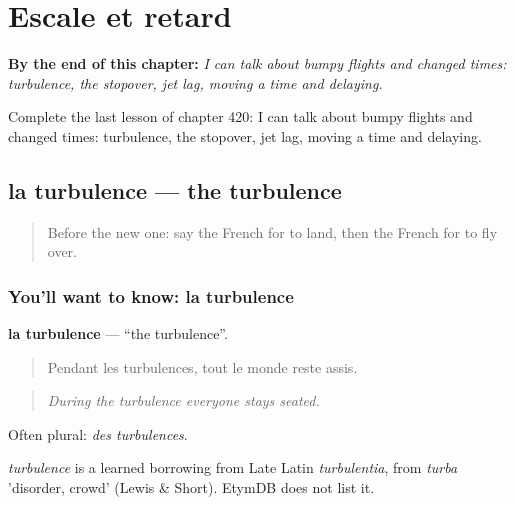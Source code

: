
\chapter{Escale et retard}
\label{ch:fr-escale-et-retard}

\begin{chapteropening}
\textbf{By the end of this chapter:} \emph{I can talk about bumpy flights and changed times: turbulence, the stopover, jet lag, moving a time and delaying.}

Complete the last lesson of chapter 420: I can talk about bumpy flights and changed times: turbulence, the stopover, jet lag, moving a time and delaying.
\end{chapteropening}

\section[la turbulence]{la turbulence — the turbulence}

\label{lesson:FR-C420-turbulence}



\begin{quote}
Before the new one: say the French for to land, then the French for to fly over.
\end{quote}

\subsection*{You'll want to know: la turbulence}
\textbf{la turbulence} — \textquotedblleft{}the turbulence\textquotedblright{}.

\begin{quote}
Pendant les turbulences, tout le monde reste assis.
\end{quote}

\begin{quote}
\emph{During the turbulence everyone stays seated.}
\end{quote}

Often plural: \emph{des turbulences}.

\begin{cousinweb}
\emph{turbulence} is a learned borrowing from Late Latin \emph{turbulentia}, from \emph{turba} 'disorder, crowd' (Lewis \& Short). EtymDB does not list it.
\end{cousinweb}

